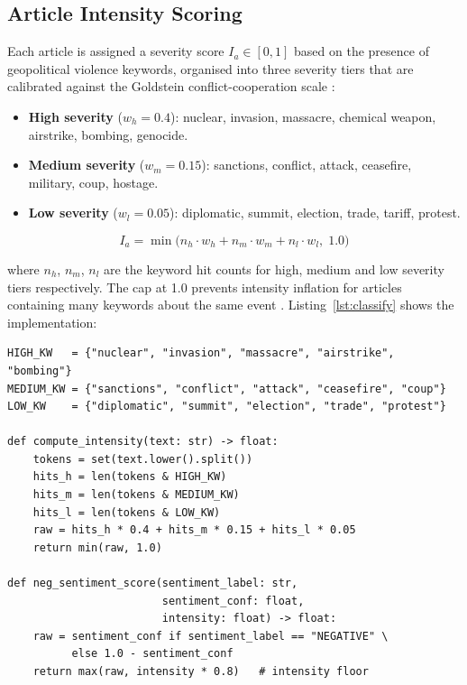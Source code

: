 \documentclass[12pt,a4paper]{report}
\begin{document}
\subsection{Article Intensity Scoring}
\label{sec:intensity}

Each article is assigned a severity score $I_a \in [0, 1]$ based on the
presence of geopolitical violence keywords, organised into three severity
tiers that are calibrated against the Goldstein conflict-cooperation scale
\cite{goldstein1992}:

\begin{itemize}
  \item \textbf{High severity} ($w_h = 0.4$): nuclear, invasion, massacre,
        chemical weapon, airstrike, bombing, genocide.
  \item \textbf{Medium severity} ($w_m = 0.15$): sanctions, conflict,
        attack, ceasefire, military, coup, hostage.
  \item \textbf{Low severity} ($w_l = 0.05$): diplomatic, summit,
        election, trade, tariff, protest.
\end{itemize}

\begin{equation}
  I_a = \min\!\bigl(n_h \cdot w_h + n_m \cdot w_m + n_l \cdot w_l,\; 1.0\bigr)
  \label{eq:intensity}
\end{equation}

\noindent where $n_h$, $n_m$, $n_l$ are the keyword hit counts for high,
medium and low severity tiers respectively. The cap at 1.0 prevents
intensity inflation for articles containing many keywords about the same
event \cite{manela2017}. Listing~\ref{lst:classify} shows the
implementation:

\begin{lstlisting}[caption={Article-level intensity and negative sentiment
  score computation (simplified from \texttt{ml/pipeline/nlp/classify.py}).},
  label={lst:classify}]
HIGH_KW   = {"nuclear", "invasion", "massacre", "airstrike", "bombing"}
MEDIUM_KW = {"sanctions", "conflict", "attack", "ceasefire", "coup"}
LOW_KW    = {"diplomatic", "summit", "election", "trade", "protest"}

def compute_intensity(text: str) -> float:
    tokens = set(text.lower().split())
    hits_h = len(tokens & HIGH_KW)
    hits_m = len(tokens & MEDIUM_KW)
    hits_l = len(tokens & LOW_KW)
    raw = hits_h * 0.4 + hits_m * 0.15 + hits_l * 0.05
    return min(raw, 1.0)

def neg_sentiment_score(sentiment_label: str,
                        sentiment_conf: float,
                        intensity: float) -> float:
    raw = sentiment_conf if sentiment_label == "NEGATIVE" \
          else 1.0 - sentiment_conf
    return max(raw, intensity * 0.8)   # intensity floor
\end{lstlisting}
\end{document}
